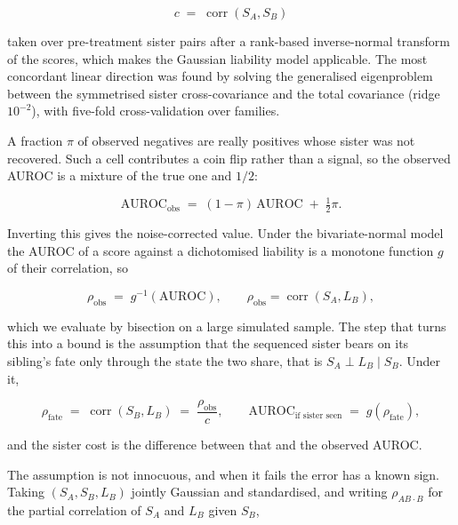 \documentclass[11pt,a4paper]{article}
\begin{document}
\begin{equation}
c \;=\; \operatorname{corr}(S_A, S_B)
\end{equation}

taken over pre-treatment sister pairs after a rank-based inverse-normal transform of the scores, which makes the Gaussian liability model applicable. The most concordant linear direction was found by solving the generalised eigenproblem between the symmetrised sister cross-covariance and the total covariance (ridge $10^{-2}$), with five-fold cross-validation over families.

A fraction $\pi$ of observed negatives are really positives whose sister was not recovered. Such a cell contributes a coin flip rather than a signal, so the observed AUROC is a mixture of the true one and $1/2$:

\begin{equation}
\mathrm{AUROC}_{\text{obs}} \;=\; (1-\pi)\,\mathrm{AUROC} \;+\; \tfrac{1}{2}\pi .
\end{equation}

Inverting this gives the noise-corrected value. Under the bivariate-normal model the AUROC of a score against a dichotomised liability is a monotone function $g$ of their correlation, so

\begin{equation}
\rho_{\text{obs}} \;=\; g^{-1}\!\left(\mathrm{AUROC}\right), \qquad
\rho_{\text{obs}} = \operatorname{corr}(S_A, L_B),
\end{equation}

which we evaluate by bisection on a large simulated sample. The step that turns this into a bound is the assumption that the sequenced sister bears on its sibling's fate only through the state the two share, that is $S_A \perp L_B \mid S_B$. Under it,

\begin{equation}
\rho_{\text{fate}} \;=\; \operatorname{corr}(S_B, L_B) \;=\; \frac{\rho_{\text{obs}}}{c},
\qquad \mathrm{AUROC}_{\text{if sister seen}} \;=\; g\!\left(\rho_{\text{fate}}\right),
\end{equation}

and the sister cost is the difference between that and the observed AUROC.

The assumption is not innocuous, and when it fails the error has a known sign. Taking $(S_A, S_B, L_B)$ jointly Gaussian and standardised, and writing $\rho_{AB\cdot B}$ for the partial correlation of $S_A$ and $L_B$ given $S_B$,
\end{document}
